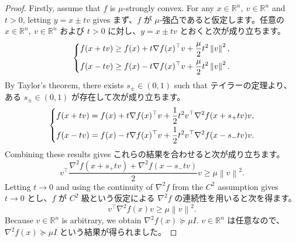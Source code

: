 \documentclass[0_main]{subfiles}
\begin{document}
\begin{proof}
    \ifEn
        Firstly, assume that $f$ is $\mu$-strongly convex. For any $x \in \mathbb{R}^n, \ v \in \mathbb{R}^n$ and $t > 0$, letting $y=x \pm tv$ gives
    \else
        まず、$f$ が $\mu$-強凸であると仮定します。任意の $x \in \mathbb{R}^n, \ v \in \mathbb{R}^n$ および $t>0$ に対し、$y=x \pm tv$ とおくと次が成り立ちます。
    \fi
    \begin{equation*}
        \begin{dcases}
            f(x + tv)\ge f(x) + t\nabla f(x)^\top v+\frac{\mu}{2}t^2\left\lVert v \right\rVert^2, \\
            f(x - tv)\ge f(x) - t\nabla f(x)^\top v+\frac{\mu}{2}t^2\left\lVert v \right\rVert^2.
        \end{dcases}
    \end{equation*}
    \ifEn
        By Taylor's theorem, there exists $s_\pm \in (0,1)$ such that
    \else
        テイラーの定理より、ある $s_\pm \in (0,1)$ が存在して次が成り立ちます。
    \fi
    \begin{equation*}
        \begin{dcases}
            f(x + tv) = f(x) + t\nabla f(x)^\top v + \frac{1}{2} t^2 v^\top \nabla^2 f(x + s_+ t v) v, \\
            f(x - tv) = f(x) - t\nabla f(x)^\top v + \frac{1}{2} t^2 v^\top \nabla^2 f(x - s_- t v) v.
        \end{dcases}
    \end{equation*}
    \ifEn
        Combining these results gives
    \else
        これらの結果を合わせると次が成り立ちます。
    \fi
    \begin{equation*}
        v^\top \frac{\nabla^2 f(x+ s_+ t v) + \nabla^2 f(x - s_- t v)}{2} v \ge \mu \left\lVert v \right\rVert^2.
    \end{equation*}
    \ifEn
        Letting $t \to 0$ and using the continuity of $\nabla^2 f$ from the $C^2$ assumption gives
    \else
        $t \to 0$ とし、$f$ が $C^2$ 級という仮定による $\nabla^2 f$ の連続性を用いると次を得ます。
    \fi
    \begin{equation*}
        v^\top \nabla^2 f(x) v \ge \mu \left\lVert v \right\rVert^2.
    \end{equation*}
    \ifEn
        Because $v \in \mathbb{R}^n$ is arbitrary, we obtain $\nabla^2 f(x)\succeq \mu I$.
    \else
        $v \in \mathbb{R}^n$ は任意なので、$\nabla^2 f(x)\succeq \mu I$ という結果が得られました。
    \fi


\end{proof}
\end{document}
